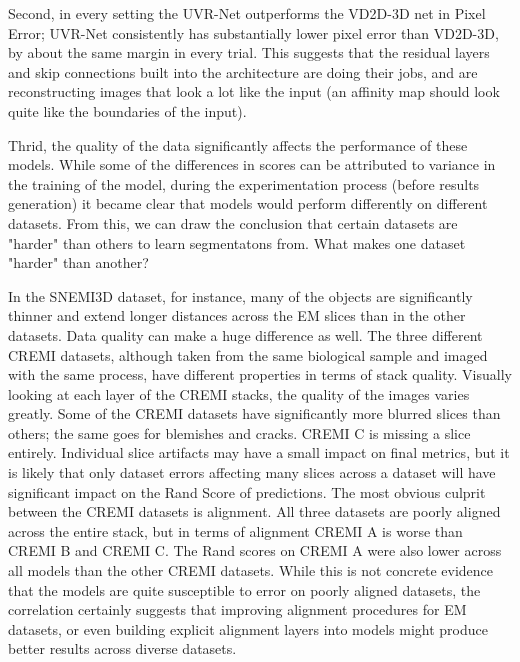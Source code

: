 Second, in every setting the UVR-Net outperforms the VD2D-3D net in Pixel Error; UVR-Net consistently has substantially lower pixel error than VD2D-3D, by about the same margin in every trial. This suggests that the residual layers and skip connections built into the architecture are doing their jobs, and are reconstructing images that look a lot like the input (an affinity map should look quite like the boundaries of the input). 

Thrid, the quality of the data significantly affects the performance of these models. While some of the differences in scores can be attributed to variance in the training of the model, during the experimentation process (before results generation) it became clear that models would perform differently on different datasets. From this, we can draw the conclusion that certain datasets are "harder" than others to learn segmentatons from. What makes one dataset "harder" than another? 

In the SNEMI3D dataset, for instance, many of the objects are significantly thinner and extend longer distances across the EM slices than in the other datasets. Data quality can make a huge difference as well. The three different CREMI datasets, although taken from the same biological sample and imaged with the same process, have different properties in terms of stack quality. Visually looking at each layer of the CREMI stacks, the quality of the images varies greatly. Some of the CREMI datasets have significantly more blurred slices than others; the same goes for blemishes and cracks. CREMI C is missing a slice entirely. Individual slice artifacts may have a small impact on final metrics, but it is likely that only dataset errors affecting many slices across a dataset will have significant impact on the Rand Score of predictions. The most obvious culprit between the CREMI datasets is alignment. All three datasets are poorly aligned across the entire stack, but in terms of alignment CREMI A is worse than CREMI B and CREMI C. The Rand scores on CREMI A were also lower across all models than the other CREMI datasets. While this is not concrete evidence that the models are quite susceptible to error on poorly aligned datasets, the correlation certainly suggests that improving alignment procedures for EM datasets, or even building explicit alignment layers into models might produce better results across diverse datasets.
